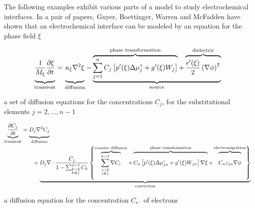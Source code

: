 The following examples exhibit various parts of a model to study
electrochemical interfaces.  In a pair of papers, Guyer, Boettinger, Warren
and McFadden \cite{ElPhFI,ElPhFII} have shown that an electrochemical
interface can be modeled by an equation for the phase field \( \xi \)

\begin{equation}
    \label{eq:elphf:phase}
    \underbrace{
	\frac{1}{M_\xi}\frac{\partial \xi}{\partial t}
	\vphantom{\sum_{j=1}^{n} C_j}
    }_{\text{transient}}
    = 
    \underbrace{
	\kappa_{\xi}\nabla^2 \xi
	\vphantom{\sum_{j=1}^{n} C_j}
    }_{\text{diffusion}}
    - 
    \underbrace{
	\overbrace{
	    \sum_{j=1}^{n} C_j \left[
		p'(\xi) \Delta\mu_j^\circ
		+ g'(\xi) W_j
	    \right]
	}^{\text{phase transformation}}
	+
	\overbrace{
	    \frac{\epsilon'(\xi)}{2}\left(\nabla\phi\right)^2
	    \vphantom{\sum_{j=1}^{n} C_j}
	}^{\text{dielectric}}
    }_{\text{source}}
\end{equation}

a set of diffusion equations for the concentrations \( C_j \), for the substitutional elements
\( j = 2,\ldots, n-1 \)

\begin{align}
    \label{eq:elphf:substitutional}
   \underbrace{
	\frac{\partial C_j}{\partial t}
   }_{\text{transient}}
    &= \underbrace{
	D_{j}\nabla^2 C_j
	\vphantom{\frac{\partial C_j}{\partial t}}
    }_{\text{diffusion}} \\
    & \qquad + \underbrace{
	D_{j}\nabla\cdot 
	\frac{C_j}{1 - \sum_{\substack{k=2\\ k \neq j}}^{n-1} C_k}
	\left\{
	    \overbrace{
		\sum_{\substack{i=2\\ i \neq j}}^{n-1} \nabla C_i
	    }^{\text{counter diffusion}}
	   + 
	   \overbrace{ 
		C_n \left[
		    p'(\xi) \Delta\mu_{jn}^{\circ}
		    + g'(\xi) W_{jn}
		\right] \nabla\xi
		\vphantom{\sum_{\substack{i=2\\ i \neq j}}^{n-1} \nabla C_i}
	   }^{\text{phase transformation}}
	   +
	   \overbrace{
		C_n z_{jn} \nabla \phi
		\vphantom{\sum_{\substack{i=2\\ i \neq j}}^{n-1} \nabla C_i}
	   }^{\text{electromigration}}
	\right\}
    }_{\text{convection}}
\end{align}

a diffusion equation for the concentration \( C_{\text{e}^{-}} \) of
electrons

